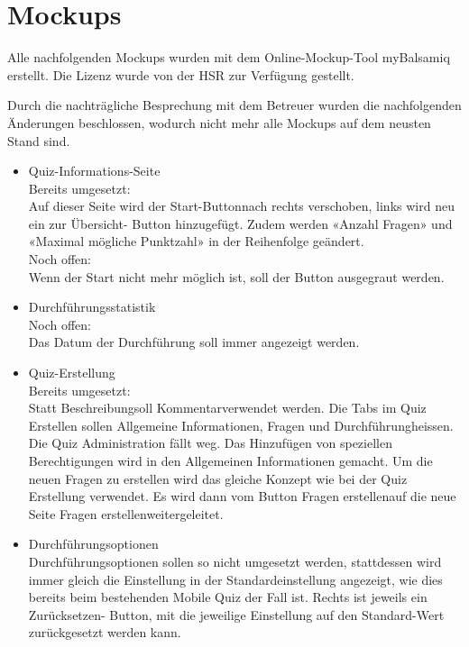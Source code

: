 \documentclass[12pt, a4paper]{report}
\begin{document}
	
	\chapter{Mockups}
	\label{chap:mockups}
	Alle nachfolgenden Mockups wurden mit dem Online-Mockup-Tool myBalsamiq erstellt. Die Lizenz wurde von der HSR zur Verfügung gestellt.
	
	Durch die nachträgliche Besprechung mit dem Betreuer wurden die nachfolgenden  Änderungen beschlossen, wodurch nicht mehr alle Mockups auf dem neusten Stand sind.
	\begin{itemize}
		\item Quiz-Informations-Seite\\
		Bereits umgesetzt:\\
		Auf dieser Seite wird der \glqq Start-Button\grqq nach rechts verschoben, links wird neu ein \glqq zur Übersicht\grqq - Button hinzugefügt. Zudem werden «Anzahl Fragen» und «Maximal mögliche Punktzahl» in der Reihenfolge geändert.\\
		Noch offen:\\
		Wenn der Start nicht mehr möglich ist, soll der Button ausgegraut werden.
		\item Durchführungsstatistik\\
		Noch offen:\\
		Das Datum der Durchführung soll immer angezeigt werden.
		\item Quiz-Erstellung\\
		Bereits umgesetzt:\\
		Statt \glqq Beschreibung\grqq soll \glqq Kommentar\grqq verwendet werden. Die Tabs im Quiz Erstellen sollen \glqq Allgemeine Informationen, Fragen und Durchführung\grqq heissen. Die Quiz Administration fällt weg. Das Hinzufügen von speziellen Berechtigungen wird in den Allgemeinen Informationen gemacht. Um die neuen Fragen zu erstellen wird das gleiche Konzept wie bei der Quiz Erstellung verwendet. Es wird dann vom Button \glqq Fragen erstellen\grqq auf die neue Seite \glqq Fragen erstellen\grqq weitergeleitet.
		
		\item Durchführungsoptionen\\
		Durchführungsoptionen sollen so nicht umgesetzt werden, stattdessen wird immer gleich die Einstellung in der Standardeinstellung angezeigt, wie dies bereits beim bestehenden Mobile Quiz der Fall ist. Rechts ist jeweils ein \glqq Zurücksetzen\grqq - Button, mit die jeweilige Einstellung auf den Standard-Wert zurückgesetzt werden kann.
		
	\end{itemize}
	
\end{document}
